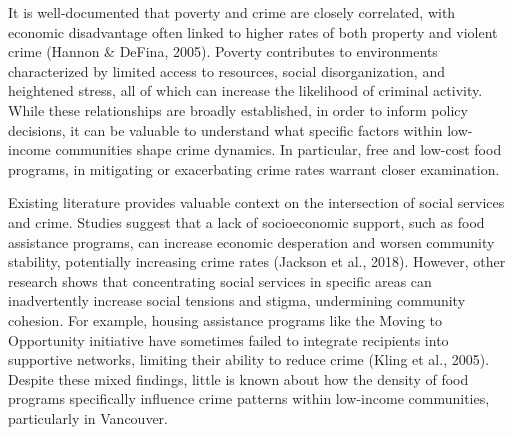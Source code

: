 \documentclass[AEJ]{AEA}
\begin{document}





It is well-documented that poverty and crime are closely correlated,
with economic disadvantage often linked to higher rates of both property
and violent crime (Hannon \& DeFina, 2005). Poverty contributes to
environments characterized by limited access to resources, social
disorganization, and heightened stress, all of which can increase the
likelihood of criminal activity. While these relationships are broadly
established, in order to inform policy decisions, it can be valuable to
understand what specific factors within low-income communities shape
crime dynamics. In particular, free and low-cost food programs, in
mitigating or exacerbating crime rates warrant closer examination.

Existing literature provides valuable context on the intersection of
social services and crime. Studies suggest that a lack of socioeconomic
support, such as food assistance programs, can increase economic
desperation and worsen community stability, potentially increasing crime
rates (Jackson et al., 2018). However, other research shows that
concentrating social services in specific areas can inadvertently
increase social tensions and stigma, undermining community cohesion. For
example, housing assistance programs like the Moving to Opportunity
initiative have sometimes failed to integrate recipients into supportive
networks, limiting their ability to reduce crime (Kling et al., 2005).
Despite these mixed findings, little is known about how the density of
food programs specifically influence crime patterns within low-income
communities, particularly in Vancouver.
\end{document}
